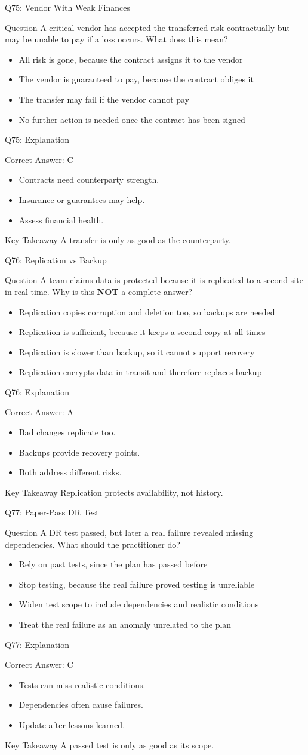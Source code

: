 \documentclass[aspectratio=169]{beamer}
\newcommand{\hq}[7]{%
	\begin{frame}{Q#1: #2}
		\begin{block}{Question}
			#3
		\end{block}
		\begin{itemize}
			#4
		\end{itemize}
	\end{frame}
	\begin{frame}{Q#1: Explanation}
		\begin{block}{Correct Answer: #5}
			\begin{itemize}
				#6
			\end{itemize}
		\end{block}
		\begin{alertblock}{Key Takeaway}
			#7
		\end{alertblock}
	\end{frame}
}
\begin{document}
	\hq{75}{Vendor With Weak Finances}
	{A critical vendor has accepted the transferred risk contractually but may be unable to pay if a loss occurs. What does this mean?}
	{\item[\textbf{(A)}] All risk is gone, because the contract assigns it to the vendor
		\item[\textbf{(B)}] The vendor is guaranteed to pay, because the contract obliges it
		\item[\textbf{(C)}] The transfer may fail if the vendor cannot pay
		\item[\textbf{(D)}] No further action is needed once the contract has been signed}
	{C}
	{\item Contracts need counterparty strength.
		\item Insurance or guarantees may help.
		\item Assess financial health.}
	{A transfer is only as good as the counterparty.}

	\hq{76}{Replication vs Backup}
	{A team claims data is protected because it is replicated to a second site in real time. Why is this \textbf{NOT} a complete answer?}
	{\item[\textbf{(A)}] Replication copies corruption and deletion too, so backups are needed
		\item[\textbf{(B)}] Replication is sufficient, because it keeps a second copy at all times
		\item[\textbf{(C)}] Replication is slower than backup, so it cannot support recovery
		\item[\textbf{(D)}] Replication encrypts data in transit and therefore replaces backup}
	{A}
	{\item Bad changes replicate too.
		\item Backups provide recovery points.
		\item Both address different risks.}
	{Replication protects availability, not history.}

	\hq{77}{Paper-Pass DR Test}
	{A DR test passed, but later a real failure revealed missing dependencies. What should the practitioner do?}
	{\item[\textbf{(A)}] Rely on past tests, since the plan has passed before
		\item[\textbf{(B)}] Stop testing, because the real failure proved testing is unreliable
		\item[\textbf{(C)}] Widen test scope to include dependencies and realistic conditions
		\item[\textbf{(D)}] Treat the real failure as an anomaly unrelated to the plan}
	{C}
	{\item Tests can miss realistic conditions.
		\item Dependencies often cause failures.
		\item Update after lessons learned.}
	{A passed test is only as good as its scope.}
\end{document}
